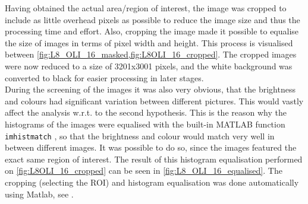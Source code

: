 Having obtained the actual area/region of interest, the image was cropped to include as little overhead pixels as possible to reduce the image size and thus the processing time and effort. Also, cropping the image made it possible to equalise the size of images in terms of pixel width and height. This process is visualised between \cref{fig:L8_OLI_16_masked,fig:L8OLI_16_cropped}. The cropped images were now reduced to a size of 3201x3001 pixels, and the white background was converted to black for easier processing in later stages. \\
During the screening of the images it was also very obvious, that the brightness and colours had significant variation between different pictures. This would vastly affect the analysis w.r.t. to the second hypothesis. This is the reason why the histograms of the images were equalised with the built-in MATLAB function \texttt{imhistmatch} , so that the brightness and colour would match very well in between different images. It was possible to do so, since the images featured the exact same region of interest. The result of this histogram equalisation performed on \cref{fig:L8OLI_16_cropped} can be seen in \cref{fig:L8_OLI_16_equalised}.
The cropping (selecting the ROI) and histogram equalisation was done automatically using Matlab, see .



